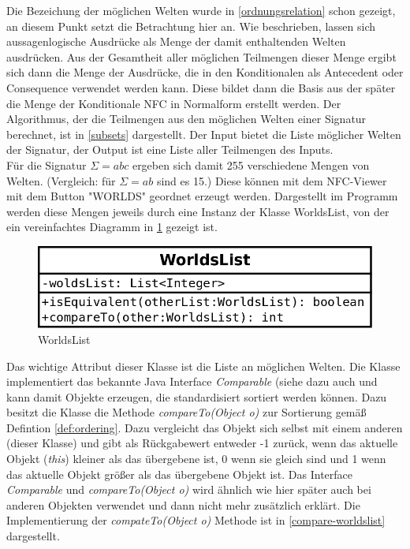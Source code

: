 \documentclass[12pt,a4paper]{article}
\begin{document}
Die Bezeichung der möglichen Welten wurde in \autoref{ordnungsrelation} schon gezeigt, an diesem Punkt setzt die Betrachtung hier an. Wie beschrieben, lassen sich aussagenlogische Ausdrücke als Menge der damit enthaltenden Welten ausdrücken. Aus der Gesamtheit aller möglichen Teilmengen dieser Menge ergibt sich dann die Menge der Ausdrücke, die in den Konditionalen als Antecedent oder Consequence verwendet werden kann. Diese bildet dann die Basis aus der später die Menge der Konditionale NFC in Normalform erstellt werden. Der Algorithmus, der die Teilmengen aus den möglichen Welten einer Signatur berechnet, ist in \autoref{subsets} dargestellt. Der Input bietet die Liste möglicher Welten der Signatur, der Output ist eine Liste aller Teilmengen des Inputs. \\
Für die Signatur $\Sigma = {abc}$ ergeben sich damit 255 verschiedene Mengen von Welten. (Vergleich: für $\Sigma=ab$ sind es 15.) Diese können mit dem NFC-Viewer mit dem Button "WORLDS" \space geordnet erzeugt werden. Dargestellt im Programm werden diese Mengen jeweils durch eine Instanz der Klasse WorldsList, von der ein vereinfachtes Diagramm in \ref{worldslist} gezeigt ist. 
\begin{figure}
\includegraphics[width=0.45\linewidth]{bilder/worldslist.png}
\caption{WorldsList}
\label{worldslist}
\end{figure}
Das wichtige Attribut dieser Klasse ist die Liste an möglichen Welten. Die Klasse implementiert das bekannte Java Interface  \textit{Comparable} (siehe dazu auch \cite{oracle2019} und kann damit Objekte erzeugen, die standardisiert sortiert werden können. Dazu besitzt die Klasse die Methode \textit{compareTo(Object o)} zur Sortierung gemäß Defintion \ref{def:ordering}. Dazu vergleicht das Objekt sich selbst mit einem anderen (dieser Klasse) und gibt als Rückgabewert entweder -1 zurück, wenn das aktuelle  Objekt (\textit{this}) kleiner als das übergebene ist, 0 wenn sie gleich sind und 1 wenn das aktuelle Objekt größer als das übergebene Objekt ist. Das Interface  \textit{Comparable} und \textit{compareTo(Object o)} wird ähnlich wie hier später auch bei anderen Objekten verwendet und dann nicht mehr zusätzlich erklärt. Die Implementierung der \textit{compateTo(Object o)} Methode ist in \autoref{compare-worldslist} dargestellt.
\end{document}
